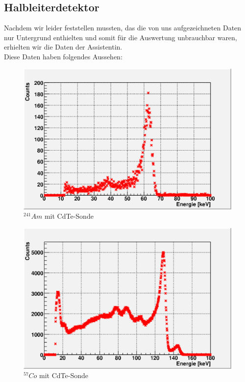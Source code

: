 \documentclass[12pt]{article}
\begin{document}
\subsection{Halbleiterdetektor}
Nachdem wir leider feststellen mussten, das die von uns aufgezeichneten Daten nur Untergrund enthielten und somit für die Auswertung unbrauchbar waren, erhielten wir die Daten der Assistentin.\\

Diese Daten haben folgendes Aussehen:
\begin{figure}[H]
\centering
\includegraphics[width=0.9\linewidth]{pictures/gamma/scaled_cdte_am.eps}
\caption{$^{241}Am$ mit CdTe-Sonde}
\end{figure}

\begin{figure}[H]
\centering
\includegraphics[width=0.9\linewidth]{pictures/gamma/scaled_cdte_co.eps}
\caption{$^{57}Co$ mit CdTe-Sonde}
\end{figure}
\end{document}
